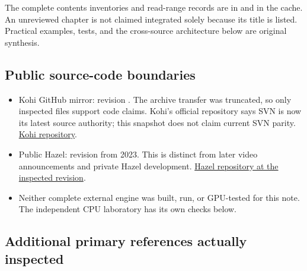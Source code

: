 The complete contents inventories and read-range records are in  and  in the cache. An unreviewed chapter is not claimed integrated solely because its title is listed. Practical examples, tests, and the cross-source architecture below are original synthesis.

\subsection{Public source-code boundaries}\label{appendix-877738f6f4d2-public-source-code-boundaries}

\hypertarget{appendix-877738f6f4d2-public-source-code-boundaries}{}

\begin{itemize}
\tightlist
\item
  Kohi GitHub mirror: revision . The archive transfer was truncated, so only inspected files support code claims. Kohi's official repository says SVN is now its latest source authority; this snapshot does not claim current SVN parity. \href{https://github.com/travisvroman/kohi}{Kohi repository}.
\item
  Public Hazel: revision  from 2023. This is distinct from later video announcements and private Hazel development. \href{https://github.com/TheCherno/Hazel/tree/1feb70572fa87fa1c4ba784a2cfeada5b4a500db}{Hazel repository at the inspected revision}.
\item
  Neither complete external engine was built, run, or GPU-tested for this note. The independent CPU laboratory has its own checks below.
\end{itemize}

\subsection{Additional primary references actually inspected}\label{appendix-877738f6f4d2-additional-primary-references-actually-inspected}

\hypertarget{appendix-877738f6f4d2-additional-primary-references-actually-inspected}{}

